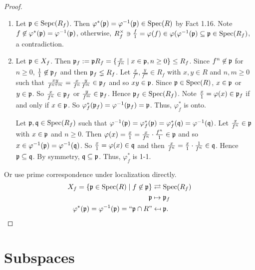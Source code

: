 \begin{proof}
    \begin{enumerate}
        \item Let $\mathfrak{p} \in \operatorname{Sepc}(R_f)$. Then $\varphi^*(\mathfrak{p}) = \varphi^{-1}(\mathfrak{p}) \in \operatorname{Spec}(R)$ by Fact 1.16. Note $f \not \in \varphi^*(\mathfrak{p}) = \varphi^{-1}(\mathfrak{p})$, otherwise, $R_f^\times \ni \frac{f}{1} = \varphi(f) \in \varphi(\varphi^{-1}(\mathfrak{p}) \subseteq \mathfrak{p} \in \operatorname{Spec}(R_f)$, a contradiction. 
        \item 
            Let $\mathfrak{p} \in X_f$. Then $\mathfrak{p}_f := \mathfrak{p} R_f = \{\frac{x}{f^n} \mid x \in \mathfrak{p}, n \geq 0\} \leq R_f$. Since $f^n \not \in \mathfrak{p}$ for $n \geq 0$, $\frac{1}{1} \not \in \mathfrak{p}_f$ and then $\mathfrak{p}_f \lneq R_f$. Let $\frac{x}{f^n},\frac{y}{f^m} \in R_f$ with $x,y \in R$ and $n,m \geq 0$ such that $\frac{xy}{f^{n+m}} = \frac{x}{f^n} \frac{y}{f^m} \in \mathfrak{p}_f$ and so $xy \in \mathfrak{p}$. Since $\mathfrak{p} \in \operatorname{Spec}(R)$, $x \in \mathfrak{p}$ or $y \in \mathfrak{p}$. So $\frac{x}{f^n} \in \mathfrak{p}_f$ or $\frac{y}{f^m} \in \mathfrak{p}_f$. Hence $\mathfrak{p}_f \in \operatorname{Spec}(R_f)$. Note $\frac{x}{1} = \varphi(x) \in \mathfrak{p}_f$ if and only if $x \in \mathfrak{p}$. So $\varphi_f^*(\mathfrak{p}_f) = \varphi^{-1}(\mathfrak{p}_f) = \mathfrak{p}$. Thus, $\varphi_f^*$ is onto. \par 
            Let $\mathfrak{p}, \mathfrak{q} \in \operatorname{Spec}(R_f)$ such that $\varphi^{-1}(\mathfrak{p}) = \varphi^*_f(\mathfrak{p}) = \varphi_f^*(\mathfrak{q}) = \varphi^{-1}(\mathfrak{q})$. Let $\frac{x}{f^n} \in \mathfrak{p}$ with $x \in \mathfrak{p}$ and $n \geq 0$. Then $\varphi(x) = \frac{x}{1} = \frac{x}{f^n} \cdot \frac{f^n}{1} \in \mathfrak{p}$ and so $x \in \varphi^{-1}(\mathfrak{p}) = \varphi^{-1}(\mathfrak{q})$. So $\frac{x}{1} = \varphi(x) \in \mathfrak{q}$ and then $\frac{x}{f^n} = \frac{x}{1} \cdot \frac{1}{f^n} \in \mathfrak{q}$. Hence $\mathfrak{p} \subseteq \mathfrak{q}$. By symmetry, $\mathfrak{q} \subseteq \mathfrak{p}$. Thus, $\varphi_f^*$ is 1-1.
    \end{enumerate}
    Or use prime correspondence under localization directly. 
    \begin{align*}
        X_f = \{\mathfrak{p} \in \operatorname{Spec}(R) \mid f \not \in \mathfrak{p}\} & \rightleftarrows \operatorname{Spec}(R_f) \\
        \mathfrak{p} &\mapsto \mathfrak{p}_f \\ 
        \varphi^*(\mathfrak{p}) = \varphi^{-1}(\mathfrak{p}) = \text{``$\mathfrak{p} \cap R$''} &\mapsfrom \mathfrak{p}. \qedhere
    \end{align*}

\end{proof}

\section*{Subspaces}

